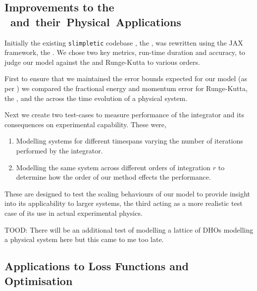 %

\subsection{Improvements to the \SI{} and their Physical Applications}

Initially the existing \texttt{slimpletic} codebase \cite{originalCode}, the \orgimpl{}, was rewritten using the JAX framework, the \updimpl{}. We chose two key metrics, run-time duration and accuracy, to judge our model against the \orgimpl{} and Runge-Kutta to various orders.

First to ensure that we maintained the error bounds expected for our model (as per ) we compared the fractional energy and momentum error for Runge-Kutta, the \orgimpl{}, and the \updimpl{} across the time evolution of a physical system.

Next we create two test-cases to measure performance of the integrator and its consequences on experimental capability. These were,

\begin{enumerate}
	\item Modelling systems for different timespans varying the number of iterations performed by the integrator.
	\item Modelling the same system across different orders of integration $r$ to determine how the order of our method effects the performance.
\end{enumerate}

These are designed to test the scaling behaviours of our model to provide insight into its applicability to larger systems, the third acting as a more realistic test case of its use in actual experimental physics. %

TOOD: There will be an additional test of modelling a lattice of DHOs modelling a physical system here but this came to me too late.

\subsection{Applications to Loss Functions and Optimisation}

